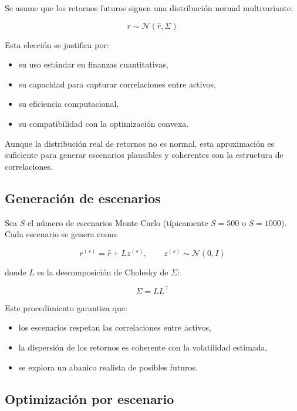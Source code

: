 \documentclass[12pt]{article}
\begin{document}
Se asume que los retornos futuros siguen una distribución normal multivariante:



\[
r \sim \mathcal{N}(\hat{r}, \Sigma)
\]



Esta elección se justifica por:

\begin{itemize}
    \item su uso estándar en finanzas cuantitativas,
    \item su capacidad para capturar correlaciones entre activos,
    \item su eficiencia computacional,
    \item su compatibilidad con la optimización convexa.
\end{itemize}

Aunque la distribución real de retornos no es normal, esta aproximación es suficiente para generar escenarios plausibles y coherentes con la estructura de correlaciones.

\subsection{Generación de escenarios}

Sea $S$ el número de escenarios Monte Carlo (típicamente $S = 500$ o $S = 1000$).  
Cada escenario se genera como:



\[
r^{(s)} = \hat{r} + L z^{(s)}, \qquad z^{(s)} \sim \mathcal{N}(0, I)
\]



donde $L$ es la descomposición de Cholesky de $\Sigma$:



\[
\Sigma = LL^\top
\]



Este procedimiento garantiza que:

\begin{itemize}
    \item los escenarios respetan las correlaciones entre activos,
    \item la dispersión de los retornos es coherente con la volatilidad estimada,
    \item se explora un abanico realista de posibles futuros.
\end{itemize}

\subsection{Optimización por escenario}
\end{document}
